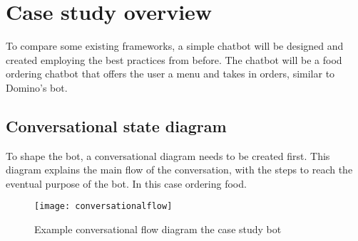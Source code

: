 \chapter{Case study overview}

To compare some existing frameworks, a simple chatbot will be designed and created employing the best practices from before. The chatbot will be a food ordering chatbot that offers the user a menu and takes in orders, similar to Domino's bot.

\section{Conversational state diagram}

To shape the bot, a conversational diagram needs to be created first. This diagram explains the main flow of the conversation, with the steps to reach the eventual purpose of the bot. In this case ordering food.

\begin{figure}[ht]
	\centering
	\texttt{[image: conversationalflow]}\label{fig:conversationalflow}
	\caption{Example conversational flow diagram the case study bot~}
\end{figure}
